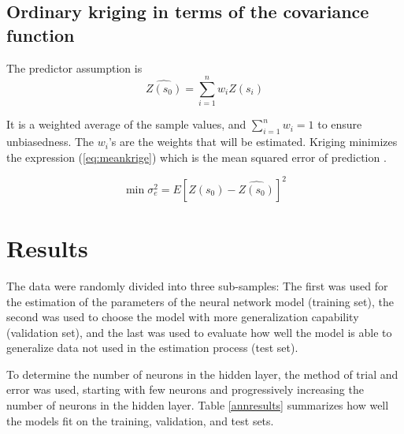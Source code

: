 \documentclass[11pt,twoside]{rmta2010eng}%
\begin{document}
\subsection*{Ordinary kriging in terms of the covariance function}
The predictor assumption is 
\begin{equation}
\hat{Z(s_{0})} = \sum_{i=1}^{n} w_{i}Z(s_{i})
\end{equation}

It is a weighted average of the sample values, and $ \sum_{i=1}^{n} w_{i} = 1 $ to ensure unbiasedness. The $w_{i}$'s are the weights that will be estimated. Kriging minimizes the expression (\ref{eq:meankrige}) which is the mean squared error of prediction \cite{nicolas2015}. 

\begin{equation}
\min \sigma^{2}_{e} = E\left[Z(s_{0}) - \hat{Z(s_{0})}\right]^{2}
\label{eq:meankrige}
\end{equation}  



\section{Results}
The data were randomly divided into three sub-samples: The first was used for the
estimation of the parameters of the neural network model (training set), the second was used to choose the model with more generalization capability (validation set), and the last was
used to evaluate how well the model is able to generalize data not used in the estimation process (test set). 

To determine the number of neurons in the hidden layer, the method of trial and error was used, starting with few neurons and progressively increasing the number of neurons in the hidden layer. Table \ref{annresults}
summarizes how well the models fit on the training, validation, and test sets.
\end{document}
